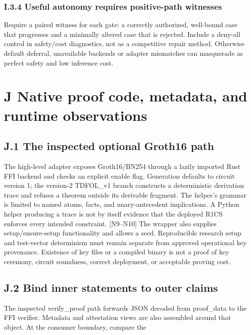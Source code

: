 \subsubsection*{I.3.4 Useful autonomy requires positive-path witnesses}
Require a paired witness for each gate: a correctly authorized, well-bound case that progresses and a
minimally altered case that is rejected. Include a deny-all control in safety/cost diagnostics, not as a
competitive repair method. Otherwise default deferral, unavailable backends or adapter mismatches
can masquerade as perfect safety and low inference cost.

\section*{J Native proof code, metadata, and runtime observations}
\subsection*{J.1 The inspected optional Groth16 path}

The high-level adapter exposes Groth16/BN254 through a lazily imported Rust FFI backend and
checks an explicit enable flag. Generation defaults to circuit version 1; the version-2 TDFOL\_v1
branch constructs a deterministic derivation trace and refuses a theorem outside its derivable fragment.
The helper’s grammar is limited to named atoms, facts, and unary-antecedent implications. A Python
helper producing a trace is not by itself evidence that the deployed R1CS enforces every intended
constraint. [N9–N10]
The wrapper also supplies setup/ensure-setup functionality and allows a seed. Reproducible research
setup and test-vector determinism must remain separate from approved operational key provenance.
Existence of key files or a compiled binary is not a proof of key ceremony, circuit soundness, correct
deployment, or acceptable proving cost.

\subsection*{J.2 Bind inner statements to outer claims}

The inspected verify\_proof path forwards JSON decoded from proof\_data to the FFI verifier. Metadata
and attestation views are also assembled around that object. At the consumer boundary, compare the


